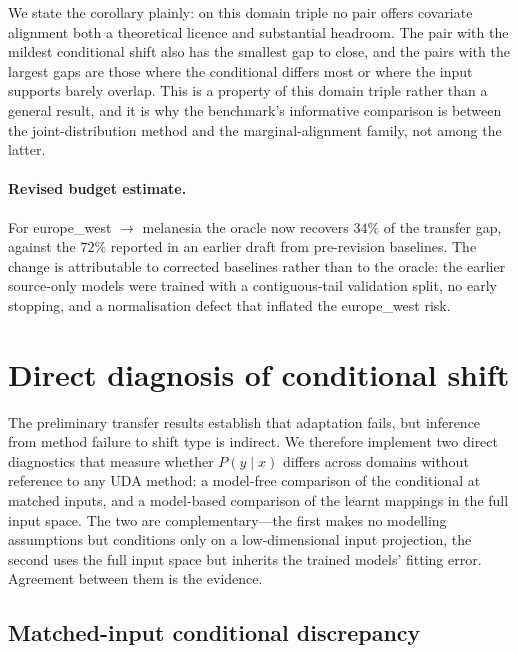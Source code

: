 \documentclass{article}
\begin{document}
We state the corollary plainly: on this domain triple no pair offers
covariate alignment both a theoretical licence and substantial
headroom. The pair with the mildest conditional shift also has the
smallest gap to close, and the pairs with the largest gaps are those
where the conditional differs most or where the input supports barely
overlap. This is a property of this domain triple rather than a general
result, and it is why the benchmark's informative comparison is between
the joint-distribution method and the marginal-alignment family, not
among the latter.

\paragraph{Revised budget estimate.}
For europe\_west $\to$ melanesia the oracle now recovers $34\%$ of the
transfer gap, against the $72\%$ reported in an earlier draft from
pre-revision baselines. The change is attributable to corrected
baselines rather than to the oracle: the earlier source-only models
were trained with a contiguous-tail validation split, no early
stopping, and a normalisation defect that inflated the europe\_west
risk.

\section{Direct diagnosis of conditional shift}\label{sec:conditional}

The preliminary transfer results establish that adaptation fails, but
inference from method failure to shift type is indirect. We therefore
implement two direct diagnostics that measure whether $P(y\mid x)$
differs across domains without reference to any UDA method: a
model-free comparison of the conditional at matched inputs, and a
model-based comparison of the learnt mappings in the full input space.
The two are complementary---the first makes no modelling assumptions
but conditions only on a low-dimensional input projection, the second
uses the full input space but inherits the trained models' fitting
error. Agreement between them is the evidence.

\subsection{Matched-input conditional discrepancy}
\label{sec:matched_input}
\end{document}
